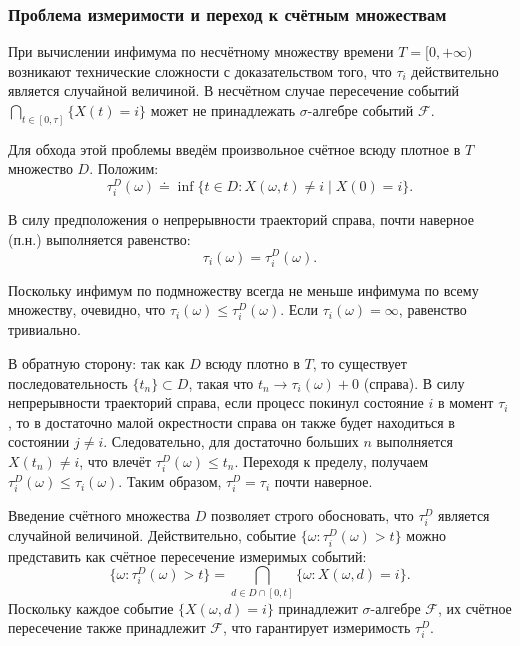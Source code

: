 \subsubsection{Проблема измеримости и переход к счётным множествам}


При вычислении инфимума по несчётному множеству времени $T = [0, +\infty)$ возникают технические сложности с доказательством того, что $\tau_i$ действительно является случайной величиной. В несчётном случае пересечение событий $\bigcap_{t \in [0, \tau]} \{X(t) = i\}$ может не принадлежать $\sigma$-алгебре событий $\mathcal{F}$.

Для обхода этой проблемы введём произвольное счётное всюду плотное в $T$ множество $D$. Положим:
\[
    \tau_i^D(\omega) \doteq \inf \{t \in D : X(\omega, t) \ne i \mid X(0) = i\}.
\]

\begin{statement}
    В силу предположения о непрерывности траекторий справа, почти наверное (п.н.) выполняется равенство:
    \[
        \tau_i(\omega) = \tau_i^D(\omega).
    \]
\end{statement}

\begin{sproof}
    Поскольку инфимум по подмножеству всегда не меньше инфимума по всему множеству, очевидно, что $\tau_i(\omega) \leqslant \tau_i^D(\omega)$. Если $\tau_i(\omega) = \infty$, равенство тривиально.
    
    В обратную сторону: так как $D$ всюду плотно в $T$, то существует последовательность $\{t_n\} \subset D$, такая что $t_n \to \tau_i(\omega) + 0$ (справа). В силу непрерывности траекторий справа, если процесс покинул состояние $i$ в момент $\tau_i$, то в достаточно малой окрестности справа он также будет находиться в состоянии $j \ne i$. Следовательно, для достаточно больших $n$ выполняется $X(t_n) \ne i$, что влечёт $\tau_i^D(\omega) \leqslant t_n$. Переходя к пределу, получаем $\tau_i^D(\omega) \leqslant \tau_i(\omega)$. Таким образом, $\tau_i^D = \tau_i$ почти наверное.
\end{sproof}

\begin{note}
    Введение счётного множества $D$ позволяет строго обосновать, что $\tau_i^D$ является случайной величиной. Действительно, событие $\{\omega : \tau_i^D(\omega) > t\}$ можно представить как счётное пересечение измеримых событий:
    \[
        \{\omega : \tau_i^D(\omega) > t\} = \bigcap_{d \in D \cap [0, t]} \{\omega : X(\omega, d) = i\}.
    \]
    Поскольку каждое событие $\{X(\omega, d) = i\}$ принадлежит $\sigma$-алгебре $\mathcal{F}$, их счётное пересечение также принадлежит $\mathcal{F}$, что гарантирует измеримость $\tau_i^D$.
\end{note}

